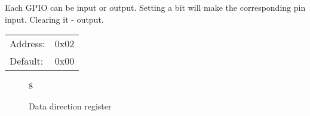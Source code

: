 \documentclass{article}
\begin{document}
		Each GPIO can be input or output. Setting a bit will make the corresponding pin input.
		Clearing it - output. 
	
		\begin{tabular}{ l c }
			Address: & 0x02 \\
			Default: & 0x00 \\
		\end{tabular}
		
		\begin{figure}[H]
			\centering
			\begin{bytefield}[
				bitwidth=0.1\linewidth]{8}
				 \\
			\end{bytefield}
			\caption{Data direction register}
			\label{reg:data_dir}
		\end{figure}
		
\end{document}
